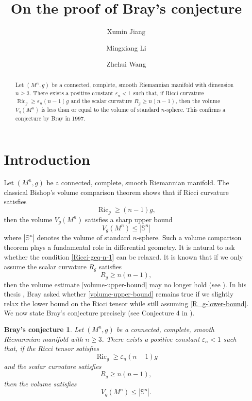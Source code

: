 \documentclass[11pt, reqno]{amsart}
\author{Xumin Jiang}
\author{Mingxiang Li}
\author{Zhehui Wang}
\title{On the proof of Bray's conjecture}
\date{}
\numberwithin{equation}{section}
\newtheorem*{Brayconjecture}{Bray's conjecture}
\theoremstyle{remark}
\DeclareMathOperator{\Ric}{Ric}
\newcommand{\Sph}{\mathbb S}
\begin{document}
\begin{abstract}

Let $(M^n,g)$ be a connected, complete, smooth  Riemannian manifold with  dimension $n\geq 3$.  There exists a positive constant $\varepsilon_n<1$ such that,  if   Ricci curvature $\Ric_g\geq \varepsilon_n(n-1)g$ and the scalar curvature $R_g\geq n(n-1)$, then the volume $V_g(M^n)$ is less than or equal to the volume of standard $n$-sphere. This confirms a conjecture by Bray in 1997.
\end{abstract}

\maketitle




\section{Introduction}
Let $(M^n,g)$ be a connected, complete, smooth Riemannian  manifold. The classical Bishop's volume comparison theorem shows that if Ricci curvature satisfies 
\begin{equation}\label{Ricci-geq-n-1}
    \Ric_g\geq (n-1)g,
\end{equation}
 then the volume $V_g(M^n)$ satisfies a sharp upper bound
 \begin{equation}\label{volume-upper-bound}
   V_g(M^n)\leq |\mathbb{S}^n|  
 \end{equation}
where $|\Sph^n|$ denotes the volume of standard $n$-sphere. Such a volume comparison theorem plays a fundamental role in differential geometry. It is natural to ask whether the condition \eqref{Ricci-geq-n-1} can be relaxed. It is known that if we only assume the scalar curvature $R_g$ satisfies
\begin{equation}\label{R_g-lower-bound}
    R_g \geq n(n-1),
\end{equation}
then the volume estimate \eqref{volume-upper-bound} may no longer hold (see \cite{CEM}). In his thesis \cite{Bray}, Bray asked whether \eqref{volume-upper-bound} remains true if we slightly relax the lower bound on the Ricci tensor while still assuming \eqref{R_g-lower-bound}. We now state Bray's conjecture precisely (see Conjecture 4 in \cite{Bray}).
\begin{Brayconjecture}\label{Bray's-conjecture-origin}
    Let $(M^n,g)$ be a connected, complete, smooth Riemannian manifold with $n\geq 3$. There exists a positive constant $\varepsilon_n<1$ such that, if the Ricci tensor satisfies 
    \begin{equation}\label{Bray'scondition-Ricci}
      \Ric_g\geq \varepsilon_n(n-1)g  
    \end{equation}
    and the scalar curvature satisfies 
    \begin{equation}\label{Bray'scondion-for-R_g}
       R_g\geq n(n-1), 
    \end{equation}
 then
 the volume satisfies 
 \begin{equation}\label{Bray's-volume-comparison}
     V_g(M^n)\leq |\Sph^n|.
 \end{equation}
\end{Brayconjecture}
\end{document}
